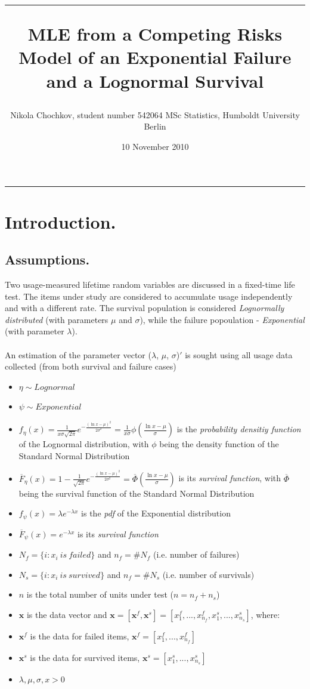 \documentclass{article}
\title{\hrule \vspace{0.3cm}MLE from a Competing Risks Model of an Exponential Failure and a Lognormal Survival}
\date{10 November 2010}
\author{Nikola Chochkov, student number 542064 MSc Statistics, Humboldt University Berlin}
\begin{document}
\maketitle
\hrule
\section{Introduction.}
\subsection{Assumptions.}
\indent \indent Two usage-measured lifetime random variables are discussed in a fixed-time life test. The items under study are considered to accumulate usage independently and with a different rate. The survival population is considered \textit{Lognormally distributed} (with parameters $\mu$ and $\sigma$), while the failure popoulation - \textit{Exponential} (with parameter $\lambda$). 
\\ 
\\ \indent An estimation of the parameter vector ($\lambda$, $\mu$, $\sigma$)$'$ is sought using all usage data collected (from both survival and failure cases) 
\begin{itemize}
\item $\eta \sim Lognormal$ 
\item $\psi \sim Exponential$
\item $f_\eta(x) = \frac{1}{x \sigma \sqrt{2 \pi}} e^{-\frac{\left( \ln x - \mu \right)^2}{2\sigma^2}} = \frac{1}{x \sigma} \phi \left( \frac{\ln x - \mu}{\sigma} \right) $ is the \textit{probability densitiy function} of the Lognormal distribution, with $\phi$ being the density function of the Standard Normal Distribution
\item $\overline F_\eta(x) = 1 - \frac{1}{\sqrt{2 \pi}} e^{-\frac{\left( \ln x - \mu \right)^2}{2\sigma^2}} = \overline \Phi \left(\frac{\ln x - \mu}{\sigma}\right)$ is its \textit{survival function}, with $\overline\Phi$ being the survival function of the Standard Normal Distribution
\item $f_\psi(x) = \lambda e^{- \lambda x}$ is the \textit{pdf} of the Exponential distribution 
\item $\overline F_\psi(x) = e^{- \lambda x}$ is its \textit{survival function}
\item $N_f = \{i : x_i\ is\ failed \}$ and $n_f  = \# N_f$ (i.e. number of failures) 
\item $N_s = \{i : x_i\ is\ survived \}$ and $n_f  = \# N_s$ (i.e. number of survivals)
\item $n$ is the total number of units under test ($n = n_f + n_s$)
\item $\textbf{x}$ is the data vector and $\textbf{x} = \left[ \textbf{x}^f, \textbf{x}^s \right] = \left[ x_1^f, ... , x_{n_f}^f, x_1^s, ... , x_{n_s}^s \right] $, where:
\item $\textbf{x}^f$ is the data for failed items, $\textbf{x}^f = \left[ x_1^f, ... , x_{n_f}^f \right] $
\item $\textbf{x}^s$ is the data for survived items, $\textbf{x}^s = \left[ x_1^s, ... , x_{n_s}^s \right] $
\item $\lambda, \mu, \sigma, x > 0$
\end{itemize}
\end{document}
